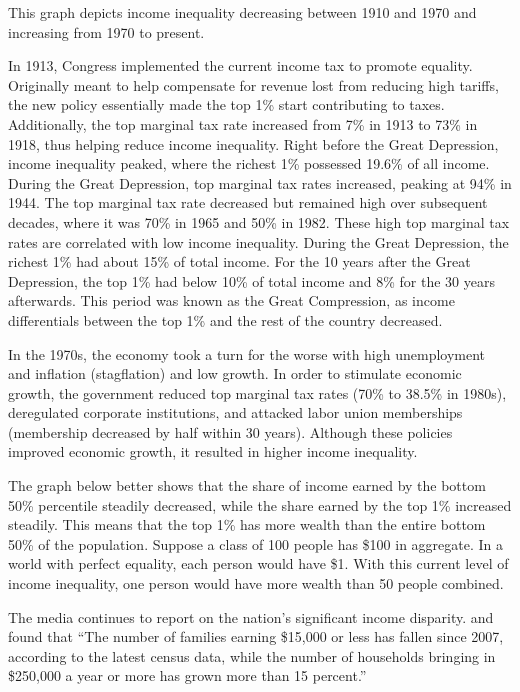 \documentclass[letterpaper,10pt,english]{jupyterBook}
\begin{document}
\noindent{}

\noindent{}

\sphinxAtStartPar
This graph depicts income inequality decreasing between 1910 and 1970 and increasing from 1970 to present.

\sphinxAtStartPar
In 1913, Congress implemented the current income tax to promote equality. Originally meant to help compensate for revenue lost from reducing high tariffs, the new policy essentially made the top 1\% start contributing to taxes. Additionally, the top marginal tax rate increased from 7\% in 1913 to 73\% in 1918, thus helping reduce income inequality. Right before the Great Depression, income inequality peaked, where the richest 1\% possessed 19.6\% of all income. During the Great Depression, top marginal tax rates increased, peaking at 94\% in 1944. The top marginal tax rate decreased but remained high over subsequent decades, where it was 70\% in 1965 and 50\% in 1982. These high top marginal tax rates are correlated with low income inequality. During the Great Depression, the richest 1\% had about 15\% of total income. For the 10 years after the Great Depression, the top 1\% had below 10\% of total income and 8\% for the 30 years afterwards. This period was known as the Great Compression, as income differentials between the top 1\% and the rest of the country decreased.

\sphinxAtStartPar
In the 1970s, the economy took a turn for the worse with high unemployment and inflation (stagflation) and low growth. In order to stimulate economic growth, the government reduced top marginal tax rates (70\% to 38.5\% in 1980s), deregulated corporate institutions, and attacked labor union memberships (membership decreased by half within 30 years). Although these policies improved economic growth, it resulted in higher income inequality.

\sphinxAtStartPar
The graph below better shows that the share of income earned by the bottom 50\% percentile steadily decreased, while the share earned by the top 1\% increased steadily. This means that the top 1\% has more wealth than the entire bottom 50\% of the population. Suppose a class of 100 people has \$100 in aggregate. In a world with perfect equality, each person would have \$1. With this current level of income inequality, one person would have more wealth than 50 people combined.

\sphinxAtStartPar
The media continues to report on the nation’s significant income disparity.  and found that “The number of families earning \$15,000 or less has fallen since 2007, according to the latest census data, while the number of households bringing in \$250,000 a year or more has grown more than 15 percent.”
\end{document}
